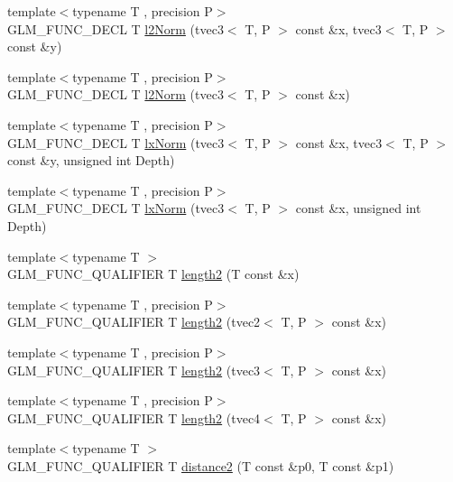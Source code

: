 \begin{DoxyCompactItemize}
\item 
{\footnotesize template$<$typename T , precision P$>$ }\\G\+L\+M\+\_\+\+F\+U\+N\+C\+\_\+\+D\+E\+C\+L T \hyperlink{group__gtx__norm_gafa6fbbc99cd44d81bf030e74eaf7ad64}{l2\+Norm} (tvec3$<$ T, P $>$ const \&x, tvec3$<$ T, P $>$ const \&y)
\item 
{\footnotesize template$<$typename T , precision P$>$ }\\G\+L\+M\+\_\+\+F\+U\+N\+C\+\_\+\+D\+E\+C\+L T \hyperlink{group__gtx__norm_ga0a8cb8a0ce88d1d977de23209bf04610}{l2\+Norm} (tvec3$<$ T, P $>$ const \&x)
\item 
{\footnotesize template$<$typename T , precision P$>$ }\\G\+L\+M\+\_\+\+F\+U\+N\+C\+\_\+\+D\+E\+C\+L T \hyperlink{group__gtx__norm_ga932bb0854e5c5a6ab5a14b023c451ca7}{lx\+Norm} (tvec3$<$ T, P $>$ const \&x, tvec3$<$ T, P $>$ const \&y, unsigned int Depth)
\item 
{\footnotesize template$<$typename T , precision P$>$ }\\G\+L\+M\+\_\+\+F\+U\+N\+C\+\_\+\+D\+E\+C\+L T \hyperlink{group__gtx__norm_gaab931b0d1acfe2f9c1cb78311edf24fc}{lx\+Norm} (tvec3$<$ T, P $>$ const \&x, unsigned int Depth)
\item 
{\footnotesize template$<$typename T $>$ }\\G\+L\+M\+\_\+\+F\+U\+N\+C\+\_\+\+Q\+U\+A\+L\+I\+F\+I\+E\+R T \hyperlink{group__gtx__norm_ga08c670024cd230e22f8b853f185ff533}{length2} (T const \&x)
\item 
{\footnotesize template$<$typename T , precision P$>$ }\\G\+L\+M\+\_\+\+F\+U\+N\+C\+\_\+\+Q\+U\+A\+L\+I\+F\+I\+E\+R T \hyperlink{namespaceglm_a875e151c20a62ae94040a751a54f3aa4}{length2} (tvec2$<$ T, P $>$ const \&x)
\item 
{\footnotesize template$<$typename T , precision P$>$ }\\G\+L\+M\+\_\+\+F\+U\+N\+C\+\_\+\+Q\+U\+A\+L\+I\+F\+I\+E\+R T \hyperlink{namespaceglm_a4cbd4c83d9779038e8f2ad4adc2020b8}{length2} (tvec3$<$ T, P $>$ const \&x)
\item 
{\footnotesize template$<$typename T , precision P$>$ }\\G\+L\+M\+\_\+\+F\+U\+N\+C\+\_\+\+Q\+U\+A\+L\+I\+F\+I\+E\+R T \hyperlink{namespaceglm_a7bdb6f10f4951764181793679d4f16a8}{length2} (tvec4$<$ T, P $>$ const \&x)
\item 
{\footnotesize template$<$typename T $>$ }\\G\+L\+M\+\_\+\+F\+U\+N\+C\+\_\+\+Q\+U\+A\+L\+I\+F\+I\+E\+R T \hyperlink{group__gtx__norm_ga3544f6288d3bce2cf2a9f6ebe39e0557}{distance2} (T const \&p0, T const \&p1)

\end{DoxyCompactItemize}
